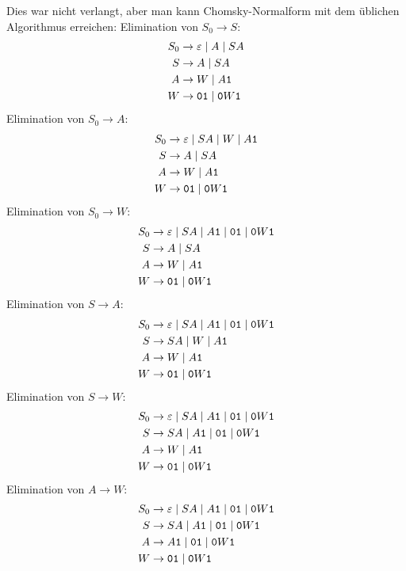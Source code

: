 \begin{loesung}
Dies war nicht verlangt, aber man kann Chomsky-Normalform mit dem
üblichen Algorithmus erreichen: Elimination von $S_0\to S$:
\begin{align*}
S_0&\to \varepsilon\mid A\mid SA\\
S  &\to A\mid SA\\
A  &\to W\mid A{\tt 1}\\
W  &\to {\tt 01}\mid  {\tt 0}W{\tt 1}
\end{align*}
Elimination von $S_0\to A$:
\begin{align*}
S_0&\to \varepsilon\mid SA\mid W\mid A{\tt 1}\\
S  &\to A\mid SA\\
A  &\to W\mid A{\tt 1}\\
W  &\to {\tt 01}\mid  {\tt 0}W{\tt 1}
\end{align*}
Elimination von $S_0\to W$:
\begin{align*}
S_0&\to \varepsilon\mid SA\mid A{\tt 1}\mid {\tt 01}\mid {\tt 0}W{\tt 1}\\
S  &\to A\mid SA\\
A  &\to W\mid A{\tt 1}\\
W  &\to {\tt 01}\mid  {\tt 0}W{\tt 1}
\end{align*}
Elimination von $S\to A$:
\begin{align*}
S_0&\to \varepsilon\mid SA\mid A{\tt 1}\mid {\tt 01}\mid {\tt 0}W{\tt 1}\\
S  &\to SA\mid W\mid A{\tt 1}\\
A  &\to W\mid A{\tt 1}\\
W  &\to {\tt 01}\mid  {\tt 0}W{\tt 1}
\end{align*}
Elimination von $S\to W$:
\begin{align*}
S_0&\to \varepsilon\mid SA\mid A{\tt 1}\mid {\tt 01}\mid {\tt 0}W{\tt 1}\\
S  &\to SA\mid A{\tt 1}\mid {\tt 01}\mid {\tt 0}W{\tt 1}\\
A  &\to W\mid A{\tt 1}\\
W  &\to {\tt 01}\mid  {\tt 0}W{\tt 1}
\end{align*}
Elimination von $A\to W$:
\begin{align*}
S_0&\to \varepsilon\mid SA\mid A{\tt 1}\mid {\tt 01}\mid {\tt 0}W{\tt 1}\\
S  &\to SA\mid A{\tt 1}\mid {\tt 01}\mid {\tt 0}W{\tt 1}\\
A  &\to A{\tt 1}\mid {\tt 01}\mid {\tt 0}W{\tt 1}\\
W  &\to {\tt 01}\mid  {\tt 0}W{\tt 1}
\end{align*}

\end{loesung}
